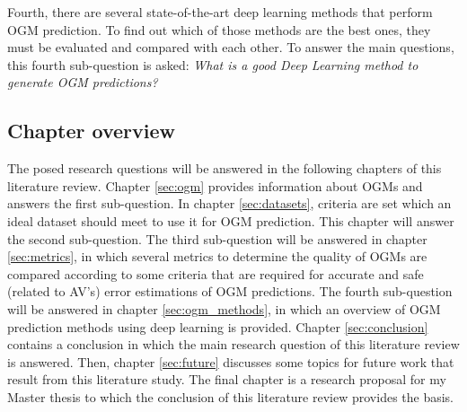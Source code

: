 Fourth, there are several state-of-the-art deep learning methods that perform \gls{OGM} prediction. To find out which of those methods are the best ones, they must be evaluated and compared with each other. To answer the main questions, this fourth sub-question is asked: \textit{What is a good Deep Learning method to generate \gls{OGM} predictions?}

\subsection{Chapter overview}
The posed research questions will be answered in the following chapters of this literature review. Chapter \ref{sec:ogm} provides information about \glspl{OGM} and answers the first sub-question. In chapter \ref{sec:datasets}, criteria are set which an ideal dataset should meet to use it for \gls{OGM} prediction. This chapter will answer the second sub-question. The third sub-question will be answered in chapter \ref{sec:metrics}, in which several metrics to determine the quality of \glspl{OGM} are compared according to some criteria that are required for accurate and safe (related to \gls{AV}'s) error estimations of \gls{OGM} predictions. The fourth sub-question will be answered in chapter \ref{sec:ogm_methods}, in which an overview of \gls{OGM} prediction methods using deep learning is provided. Chapter \ref{sec:conclusion} contains a conclusion in which the main research question of this literature review is answered. Then, chapter \ref{sec:future} discusses some topics for future work that result from this literature study. The final chapter is a research proposal for my Master thesis to which the conclusion of this literature review provides the basis.








